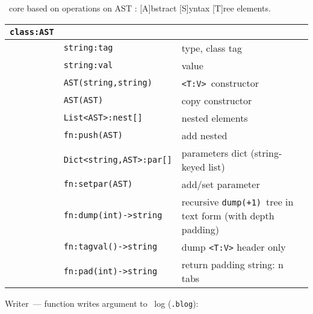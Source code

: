 \label{ast}\secdown

\bi\ core based on operations on AST :
[A]bstract [S]yntax [T]ree elements.

\bigskip
\begin{tabular}{l l l}
\verb|class:AST| &&\\
\hline
& \verb|string:tag| & type, class tag \\
& \verb|string:val| & value \\
\hline
& \verb|AST(string,string)| & \verb|<T:V>|\ constructor \\
& \verb|AST(AST)| & copy constructor \\
\hline
& \verb|List<AST>:nest[]| & nested elements \\
& \verb|fn:push(AST)| & add nested \\
\hline
& \verb|Dict<string,AST>:par[]| & parameters dict (string-keyed list) \\
& \verb|fn:setpar(AST)| & add/set parameter \\
\hline
& \verb|fn:dump(int)->string| & recursive \verb|dump(+1)|\ tree in text
form (with depth padding) \\
& \verb|fn:tagval()->string| & dump \verb|<T:V>| header only \\
& \verb|fn:pad(int)->string| & return padding string: n tabs \\  
\end{tabular} 



Writer\ --- function writes argument to \bi\ log (\verb|.blog|):



\secup